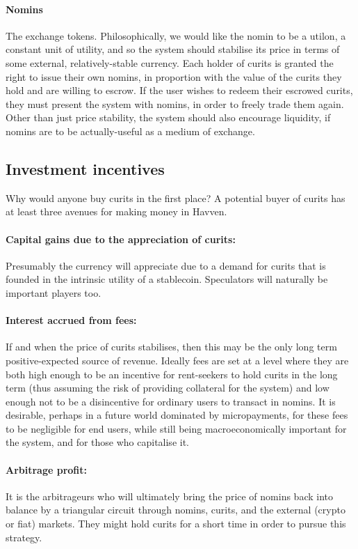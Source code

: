 \documentclass{article}
\begin{document}
\paragraph{Nomins} The exchange tokens. Philosophically, we would like the nomin to be a utilon, a constant
unit of utility, and so the system should stabilise its price in terms of some external, relatively-stable
currency. Each holder of curits is granted the right to issue their own nomins, in proportion with the value
of the curits they hold and are willing to escrow. If the user wishes to redeem their escrowed curits,
they must present the system with nomins, in order to freely trade them again. Other than just price stability,
the system should also encourage liquidity, if nomins are to be actually-useful as a medium of exchange.


\subsection{Investment incentives}
Why would anyone buy curits in the first place? A potential buyer of curits has at least three avenues for making
money in Havven.

\paragraph{Capital gains due to the appreciation of curits:}
Presumably the currency will appreciate due to a demand for curits that is founded in the intrinsic
utility of a stablecoin. Speculators will naturally be important players too.

\paragraph{Interest accrued from fees:}
If and when the price of curits stabilises, then this may be the only long term positive-expected
source of revenue. Ideally fees are set at a level where they are both high enough to be an incentive
for rent-seekers to hold curits in the long term (thus assuming the risk of providing collateral for
the system) and low enough not to be a disincentive for ordinary users to transact in nomins.
It is desirable, perhaps in a future world dominated by micropayments, for these fees to be
negligible for end users, while still being macroeconomically important for the system, and for those
who capitalise it.

\paragraph{Arbitrage profit:}
It is the arbitrageurs who will ultimately bring the price of nomins back into balance by a triangular circuit
through nomins, curits, and the external (crypto or fiat) markets. They might hold curits for a short time in order
to pursue this strategy.
\end{document}
